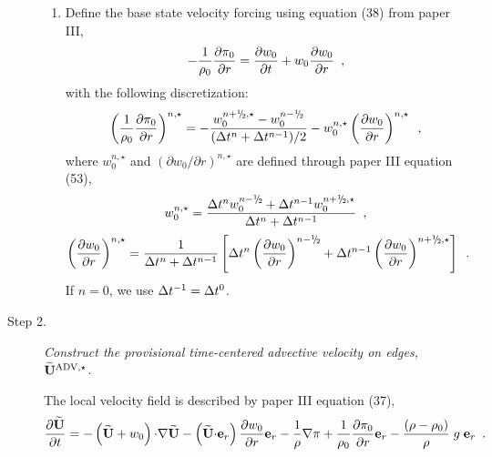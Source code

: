 \begin{description}
\begin{enumerate}
\item Define the base state velocity forcing using equation (38) from paper III,
\begin{equation}
-\frac{1}{\rho_0} \frac{\partial \pi_0}{\partial r} 
= \frac{\partial w_0}{\partial t} + w_0 \frac{\partial w_0}{\partial r} 
\enskip, \label{eq:pizero}
\end{equation}
with the following discretization:
\begin{equation}
\left ( \frac{1}{\rho_0} \frac{\partial \pi_0}{\partial r} \right )^{n,\star} = 
-\frac{w_0^{\nph,\star} - w_0^\nmh}{(\dt^n+\dt^{n-1})/2} 
- w_0^{n,\star} \left(\frac{\partial w_0}{\partial r}\right)^{n,\star} \enskip ,
\end{equation} 
where $w_0^{n,\star}$ and $(\partial w_0 / \partial r)^{n,\star}$ are defined through 
paper III equation (53),
\begin{equation}
w_0^{n,\star} = \frac{\dt^{n} w_0^{\nmh} + \dt^{n-1} w_0^{\nph,\star}}{\dt^n+\dt^{n-1}} 
\enskip,
\end{equation}
\begin{equation}
\left(\frac{\partial w_0}{\partial r}\right)^{n,\star} = 
\frac{1}{\dt^n+\dt^{n-1} } 
\left [ \dt^{n} \left(\frac{\partial w_0 }{ \partial r}\right)^{\nmh}
+ \dt^{n-1} \left(\frac{\partial w_0 }{ \partial r}\right)^{\nph,\star} \right ] 
\enskip.
\end{equation}
If $n=0$, we use $\Delta t^{-1} = \Delta t^0$.

\end{enumerate}

\item[Step 2.] {\em Construct the provisional time-centered advective velocity on 
edges, $\widetilde{\mathbf{U}}^{\mathrm{ADV},\star}$.}

The local velocity field is described by paper III equation (37),
\begin{equation}
\frac{\partial\widetilde{{\bf U}}}{\partial t} = 
- \left(\widetilde{{\bf U}}+w_0\right) \mathbf{\cdot} \mathbf{\nabla} \widetilde{{\bf U}}
- \left(\widetilde{{\bf U}} \mathbf{\cdot} \mathbf{e}_r\right) \frac{\partial w_0}{\partial r} \mathbf{e}_r
- \frac{1}{\rho} \mathbf{\nabla}\pi
+ \frac{1}{\rho_0} \frac{\partial \pi_0}{\partial r} \mathbf{e}_r
- \frac{(\rho-\rho_0)}{\rho} \; g \; \mathbf{e}_r  \label{eq:utildeupd}  \enskip .
\end{equation}


\end{description}
